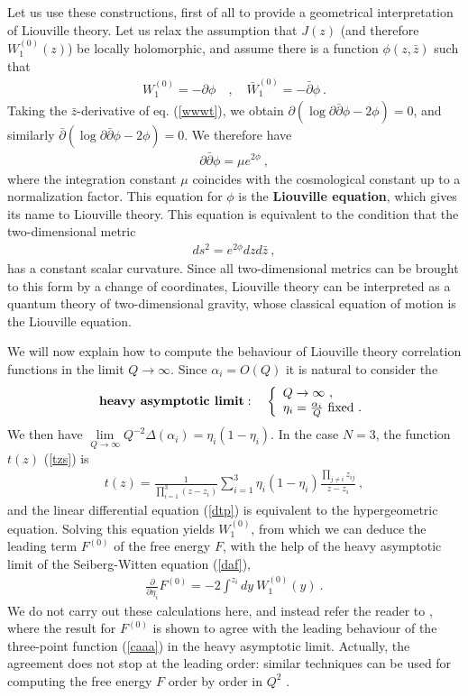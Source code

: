 \documentclass[12pt,a4paper,notitlepage]{report}
\newcommand \bla {\left\{\begin{array}{l} }
\newcommand \ela {\end{array}\right. }
\newcommand \p {\partial}
\newcommand \pp[1] {{\frac{\p}{\p #1}}}
\numberwithin{equation}{section}
\theoremstyle{break}
\begin{document}
Let us use these constructions, first of all to provide a geometrical interpretation of Liouville theory. Let us relax the assumption that $J(z)$ (and therefore $W_1^{(0)}(z)$) be locally holomorphic, and assume there is a function $\phi(z,\bar{z})$ such that 
\begin{align}
 W_1^{(0)} = - \p \phi \quad , \quad \bar{W}_1^{(0)} = -\bar{\p} \phi \ .
\end{align}
Taking the $\bar{z}$-derivative of eq. (\ref{wwwt}), we obtain $\p\left(\log \p\bar{\p}\phi -2\phi\right)=0$, and similarly $\bar{\p} \left(\log \p\bar{\p}\phi -2\phi\right)=0$. We therefore have
\begin{align}
 \p\bar{\p}\phi = \mu e^{2\phi}\ ,
\end{align}
where the integration constant $\mu$ coincides with the cosmological constant up to a normalization factor.
This equation for $\phi$ is the \textbf{\boldmath Liouville equation}, which gives its name to Liouville theory.
This equation is equivalent to the condition that the two-dimensional metric
\begin{align}
 ds^2 = e^{2\phi} dz d\bar{z}\ ,
\end{align}
has a constant scalar curvature. Since all two-dimensional metrics can be brought to this form by a change of coordinates, Liouville theory can be interpreted as a quantum theory of two-dimensional gravity, whose classical equation of motion is the Liouville equation.

We will now explain how to compute the behaviour of Liouville theory correlation functions in the limit $Q\rightarrow \infty$. Since $\alpha_i=O(Q)$ it is natural to consider the 
\begin{align}
 \textbf{\boldmath heavy\ asymptotic\ limit}\index{heavy\ asymptotic\ limit}: \quad \bla Q \rightarrow \infty \ ,\\ \eta_i=\frac{\alpha_i}{Q}\ \text{fixed}\ .\ela 
\end{align}
We then have $\underset{Q\rightarrow\infty}{\lim} Q^{-2}\Delta(\alpha_i)=\eta_i(1-\eta_i)$. In the case $N=3$, the function $t(z)$ (\ref{tzs}) is 
\begin{align}
 t(z) = \frac{1}{\prod_{i=1}^3(z-z_i)} \sum_{i=1}^3 \eta_i(1-\eta_i)\frac{\prod_{j\neq i} z_{ij}}{z-z_i}\ ,
\end{align}
and the linear differential equation (\ref{dtp}) is equivalent to the hypergeometric equation. Solving this equation yields $W_1^{(0)}$, from which we can deduce the leading term $F^{(0)}$ of the free energy $F$, with the help of the heavy asymptotic limit of the Seiberg-Witten equation (\ref{daf}), 
\begin{align}
 \pp{\eta_i} F^{(0)} = -2\int^{z_i} dy\ W_1^{(0)}(y)\ .
\end{align}
We do not carry out these calculations here, and instead refer the reader to \cite{cer12}, where the result for $F^{(0)}$ is shown to agree with the leading behaviour of the three-point function (\ref{caaa}) in the heavy asymptotic limit. Actually, the agreement does not stop at the leading order: similar techniques can be used for computing the free energy $F$ order by order in $Q^2$ \cite{cer12}.
\end{document}

